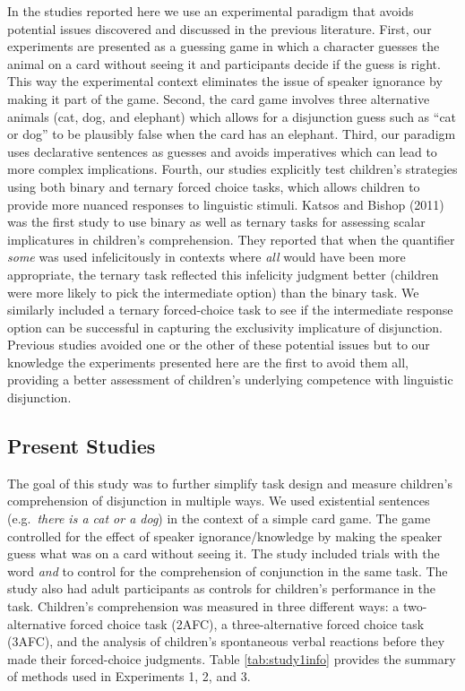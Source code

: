\documentclass[
  english,
  ,man,floatsintext]{apa6}
\begin{document}
In the studies reported here we use an experimental paradigm that avoids potential issues discovered and discussed in the previous literature. First, our experiments are presented as a guessing game in which a character guesses the animal on a card without seeing it and participants decide if the guess is right. This way the experimental context eliminates the issue of speaker ignorance by making it part of the game. Second, the card game involves three alternative animals (cat, dog, and elephant) which allows for a disjunction guess such as \enquote{cat or dog} to be plausibly false when the card has an elephant. Third, our paradigm uses declarative sentences as guesses and avoids imperatives which can lead to more complex implications. Fourth, our studies explicitly test children's strategies using both binary and ternary forced choice tasks, which allows children to provide more nuanced responses to linguistic stimuli. Katsos and Bishop (2011) was the first study to use binary as well as ternary tasks for assessing scalar implicatures in children's comprehension. They reported that when the quantifier \emph{some} was used infelicitously in contexts where \emph{all} would have been more appropriate, the ternary task reflected this infelicity judgment better (children were more likely to pick the intermediate option) than the binary task. We similarly included a ternary forced-choice task to see if the intermediate response option can be successful in capturing the exclusivity implicature of disjunction. Previous studies avoided one or the other of these potential issues but to our knowledge the experiments presented here are the first to avoid them all, providing a better assessment of children's underlying competence with linguistic disjunction.

\hypertarget{present-studies}{%
\subsection{Present Studies}\label{present-studies}}

The goal of this study was to further simplify task design and measure children's comprehension of disjunction in multiple ways. We used existential sentences (e.g.~\emph{there is a cat or a dog}) in the context of a simple card game. The game controlled for the effect of speaker ignorance/knowledge by making the speaker guess what was on a card without seeing it. The study included trials with the word \emph{and} to control for the comprehension of conjunction in the same task. The study also had adult participants as controls for children's performance in the task. Children's comprehension was measured in three different ways: a two-alternative forced choice task (2AFC), a three-alternative forced choice task (3AFC), and the analysis of children's spontaneous verbal reactions before they made their forced-choice judgments. Table \ref{tab:study1info} provides the summary of methods used in Experiments 1, 2, and 3.
\end{document}
